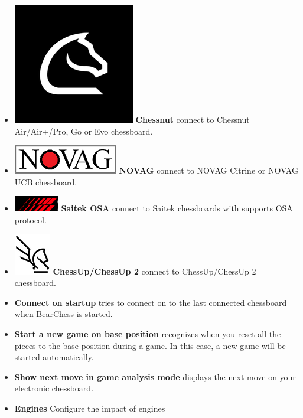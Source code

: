 \documentclass[11pt,a4paper]{article}
\begin{document}
\begin{itemize}
		\item  \includegraphics[scale=0.1]{chessnut.png} \textbf{Chessnut} connect to Chessnut Air/Air+/Pro, Go or Evo chessboard.		
		\item  \includegraphics[scale=0.3]{novag48.PNG} \textbf{NOVAG} connect to NOVAG Citrine or NOVAG UCB chessboard.			
		\item  \includegraphics[scale=0.4]{Saitek_logo.PNG} \textbf{Saitek OSA} connect to Saitek chessboards with supports OSA protocol.		
		\item  \includegraphics[scale=0.4]{ChessUp.png} \textbf{ChessUp/ChessUp 2} connect to ChessUp/ChessUp 2 chessboard.
		\item \textbf{Connect on startup} tries to connect on to the last connected chessboard when BearChess is started. 	
		\item \textbf{Start a new game on base position} recognizes when you reset all the pieces to the base position during a game. In this case, a new game will be started automatically.
		\item \textbf{Show next move in game analysis mode} displays the next move on your electronic chessboard.
		\item \textbf{Engines} Configure the impact of engines
		
	\end{itemize}
	
\end{document}
